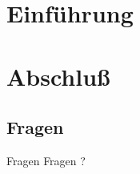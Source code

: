 
\maketitle

\begin{frame}
  \titlepage
\end{frame}

\cleardoublepage

\tableofcontents

\cleardoublepage

\section{Einführung}

\section{Abschluß}

\subsection{Fragen}

\begin{frame}{Fragen}
\centering
Fragen ?
\end{frame}



